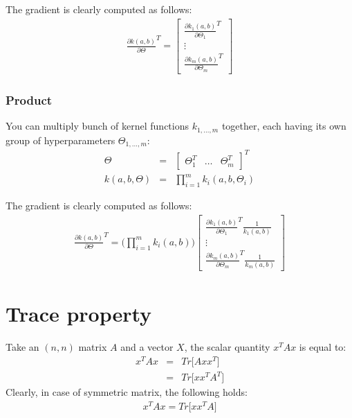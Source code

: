 \documentclass{article}
\begin{document}
The gradient is clearly computed as follows:
\begin{eqnarray}
\frac{\partial k(a,b)}{\partial \Theta}^T = \begin{bmatrix}
\frac{\partial k_1(a,b)}{\partial \Theta_1}^T
\\ 
\vdots
\\ 
\frac{\partial k_m(a,b)}{\partial \Theta_m}^T
\end{bmatrix}
\end{eqnarray}

\subsubsection{Product}

You can multiply bunch of kernel functions $k_{1,\hdots,m}$ together, each having its own group of hyperparameters $\Theta_{1,\hdots,m}$:
\begin{eqnarray}
\Theta &=& \begin{bmatrix} \Theta_1^T & \hdots & \Theta_m^T \end{bmatrix}^T \\
k(a,b,\Theta) &=& \prod_{i=1}^m k_i(a,b,\Theta_i)
\end{eqnarray}

The gradient is clearly computed as follows:
\begin{eqnarray}
\frac{\partial k(a,b)}{\partial \Theta}^T = 
\bigg( \prod_{i=1}^m k_i(a,b) \bigg)
\begin{bmatrix}
\frac{\partial k_1(a,b)}{\partial \Theta_1}^T \frac{1}{k_1(a,b)}
\\ 
\vdots
\\ 
\frac{\partial k_m(a,b)}{\partial \Theta_m}^T \frac{1}{k_m(a,b)}
\end{bmatrix}
\end{eqnarray}

\appendix

\section{Trace property}
\label{sec:trace_property}

Take an $(n,n)$ matrix $A$ and a vector $X$, the scalar quantity $x^T A x$ is equal to:
\begin{eqnarray}
x^T A x &=& Tr \bigg [ 
A xx^T
\bigg ]
\label{eq:Tr_property}
\\
&=& Tr \bigg [ 
xx^T A^T
\bigg ]
\end{eqnarray}
Clearly, in case of symmetric matrix, the following holds:
\begin{eqnarray}
x^T A x = Tr \bigg [ 
xx^T A
\bigg ]
\end{eqnarray}
\end{document}
